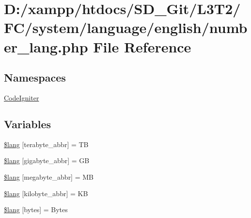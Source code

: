 \hypertarget{system_2language_2english_2number__lang_8php}{}\section{D\+:/xampp/htdocs/\+S\+D\+\_\+\+Git/\+L3\+T2/\+F\+C/system/language/english/number\+\_\+lang.php File Reference}
\label{system_2language_2english_2number__lang_8php}
\subsection*{Namespaces}
\begin{DoxyCompactItemize}
\item 
 \hyperlink{namespace_code_igniter}{Code\+Igniter}
\end{DoxyCompactItemize}
\subsection*{Variables}
\begin{DoxyCompactItemize}
\item 
\hyperlink{system_2language_2english_2number__lang_8php_a72963402ca792afbae1ba34a4050fcde}{\$lang} \mbox{[}\textquotesingle{}terabyte\+\_\+abbr\textquotesingle{}\mbox{]} = \textquotesingle{}T\+B\textquotesingle{}
\item 
\hyperlink{system_2language_2english_2number__lang_8php_a2349e7364cbc6402c44bd135b132d9d6}{\$lang} \mbox{[}\textquotesingle{}gigabyte\+\_\+abbr\textquotesingle{}\mbox{]} = \textquotesingle{}G\+B\textquotesingle{}
\item 
\hyperlink{system_2language_2english_2number__lang_8php_ae1fdf8fb2977ddec5fd9f2237f277edc}{\$lang} \mbox{[}\textquotesingle{}megabyte\+\_\+abbr\textquotesingle{}\mbox{]} = \textquotesingle{}M\+B\textquotesingle{}
\item 
\hyperlink{system_2language_2english_2number__lang_8php_a78200289bbf44dce8b0d5f06072379e6}{\$lang} \mbox{[}\textquotesingle{}kilobyte\+\_\+abbr\textquotesingle{}\mbox{]} = \textquotesingle{}K\+B\textquotesingle{}
\item 
\hyperlink{system_2language_2english_2number__lang_8php_aeec8ade1229052ff8627a350480bba9c}{\$lang} \mbox{[}\textquotesingle{}bytes\textquotesingle{}\mbox{]} = \textquotesingle{}Bytes\textquotesingle{}
\end{DoxyCompactItemize}


